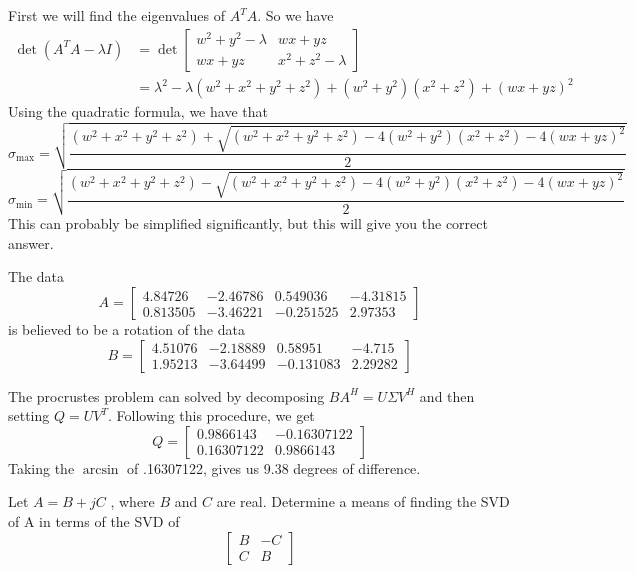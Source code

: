 \documentclass{homework}
\begin{document}
\begin{solution}
  First we will find the eigenvalues of $A^TA$. So we have
  \[ 
    \begin{aligned}
      \det(A^TA - \lambda I) &= \det 
    \begin{bmatrix}
      w^2 + y^2 - \lambda & wx + yz \\
      wx + yz & x^2 + z^2 - \lambda
    \end{bmatrix} \\ 
    &= \lambda^2 - \lambda(w^2 + x^2 + y^2 + z^2) + (w^2 + y^2)(x^2 + z^2) + (wx + yz)^2
    \end{aligned}
  \]
  Using the quadratic formula, we have that
  \[ \sigma_{\max} = \sqrt{\frac{(w^2 + x^2 + y^2 + z^2) + \sqrt{(w^2 + x^2 + y^2 + z^2) - 4(w^2 + y^2)(x^2 + z^2) - 4(wx + yz)^2}}{2}}\]
  \[ \sigma_{\min} = \sqrt{\frac{(w^2 + x^2 + y^2 + z^2) - \sqrt{(w^2 + x^2 + y^2 + z^2) - 4(w^2 + y^2)(x^2 + z^2) - 4(wx + yz)^2}}{2}}\]
  This can probably be simplified significantly, but this will give you the correct answer.
\end{solution}

\begin{problem}[7-15]
  The data
  \[A=
    \begin{bmatrix}
    4.84726 & -2.46786 & 0.549036 & -4.31815 \\
    0.813505 & -3.46221 & -0.251525 & 2.97353
    \end{bmatrix}
  \]
  is believed to be a rotation of the data
  \[B=
    \begin{bmatrix}
    4.51076 & -2.18889 & 0.58951 & -4.715 \\
    1.95213 & -3.64499 & -0.131083 & 2.29282
    \end{bmatrix}
  \]
\end{problem}

\begin{solution}
  The procrustes problem can solved by decomposing $BA^H = U\Sigma V^H$ and then setting $Q = UV^T$. Following this procedure, we get
  \[ Q =
    \begin{bmatrix}
      0.9866143 & -0.16307122 \\
      0.16307122 & 0.9866143
    \end{bmatrix}
  \]
  Taking the $\arcsin$ of .16307122, gives us 9.38 degrees of difference.
\end{solution}

\begin{problem}[7-17]
  Let $A = B + jC$ , where $B$ and $C$ are real. Determine a means of finding the SVD of A in terms of the SVD of
  \[
    \begin{bmatrix}
      B & -C \\
      C & B
    \end{bmatrix}
  \]
\end{problem}

\begin{solution}
   
\end{solution}
\end{document}
